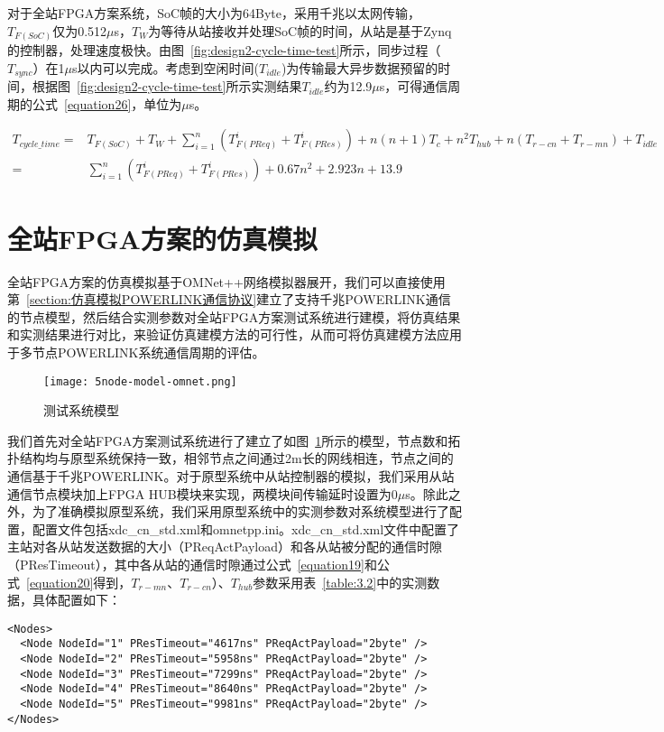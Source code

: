对于全站FPGA方案系统，SoC帧的大小为64Byte，采用千兆以太网传输，$T_{F(SoC)}$仅为0.512$\mu$s，$T_{W}$为等待从站接收并处理SoC帧的时间，从站是基于Zynq的控制器，处理速度极快。由图~\ref{fig:design2-cycle-time-test}所示，同步过程（$T_{sync}$）在1$\mu$s以内可以完成。考虑到空闲时间($T_{idle}$)为传输最大异步数据预留的时间，根据图~\ref{fig:design2-cycle-time-test}所示实测结果$T_{idle}$约为12.9$\mu$s，可得通信周期的公式~\ref{equation26}，单位为$\mu$s。

\begin{equation}
\label{equation26}
\begin{split}
T_{cycle\_time}=&T_{F(SoC)}+T_{W}+\sum_{i=1}^n(T_{F(PReq)}^{i}+T_{F(PRes)}^{i})+n(n+1)T_{c}+n^2T_{hub}+ n(T_{r-cn}+T_{r-mn})+T_{idle}\\
=&\sum_{i=1}^n(T_{F(PReq)}^{i}+T_{F(PRes)}^{i})+0.67n^{2}+2.923n+13.9
\end{split}
\end{equation}

\section{全站FPGA方案的仿真模拟}
全站FPGA方案的仿真模拟基于OMNet++网络模拟器展开，我们可以直接使用第~\ref{section:仿真模拟POWERLINK通信协议}建立了支持千兆POWERLINK通信的节点模型，然后结合实测参数对全站FPGA方案测试系统进行建模，将仿真结果和实测结果进行对比，来验证仿真建模方法的可行性，从而可将仿真建模方法应用于多节点POWERLINK系统通信周期的评估。

\begin{figure}[!htb]
  \centering
  \texttt{[image: 5node-model-omnet.png]}
  \caption{测试系统模型}
  \label{fig:5node-model-omnet}
\end{figure}

我们首先对全站FPGA方案测试系统进行了建立了如图~\ref{fig:5node-model-omnet}所示的模型，节点数和拓扑结构均与原型系统保持一致，相邻节点之间通过2m长的网线相连，节点之间的通信基于千兆POWERLINK。对于原型系统中从站控制器的模拟，我们采用从站通信节点模块加上FPGA HUB模块来实现，两模块间传输延时设置为0$\mu$s。除此之外，为了准确模拟原型系统，我们采用原型系统中的实测参数对系统模型进行了配置，配置文件包括xdc\_cn\_std.xml和omnetpp.ini。xdc\_cn\_std.xml文件中配置了主站对各从站发送数据的大小（PReqActPayload）和各从站被分配的通信时隙（PResTimeout），其中各从站的通信时隙通过公式~\ref{equation19}和公式~\ref{equation20}得到，$T_{r-mn}$、$T_{r-cn}$）、$T_{hub}$参数采用表~\ref{table:3.2}中的实测数据，具体配置如下：

\begin{lstlisting}
<Nodes>
  <Node NodeId="1" PResTimeout="4617ns" PReqActPayload="2byte" />
  <Node NodeId="2" PResTimeout="5958ns" PReqActPayload="2byte" />
  <Node NodeId="3" PResTimeout="7299ns" PReqActPayload="2byte" />
  <Node NodeId="4" PResTimeout="8640ns" PReqActPayload="2byte" />
  <Node NodeId="5" PResTimeout="9981ns" PReqActPayload="2byte" />
</Nodes>
\end{lstlisting}


